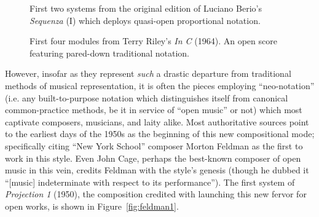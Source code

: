          \begin{figure}
            \centering
            \captionsetup{width=.5\textwidth}
            \caption[First two systems from the original edition of Luciano Berio's \textit{Sequenza} (I, 1958) which deploys quasi-open proportional notation.]{First two systems from the original edition of Luciano Berio's \textit{Sequenza} (I) which deploys quasi-open proportional notation.\footnotemark}
            \label{fig:sequenza}
        \end{figure}

            \begin{figure}
            \centering
            \captionsetup{width=.5\textwidth}
            \caption[First four modules from Terry Riley's \textit{In C} (1964).]{First four modules from Terry Riley's \textit{In C} (1964). An open score featuring pared-down traditional notation.\footnotemark}
            \label{fig:inc}
        \end{figure}

    However, insofar as they represent \textit{such} a drastic departure from traditional methods of musical representation, it is often the pieces employing ``neo-notation'' (i.e. any built-to-purpose notation which distinguishes itself from canonical common-practice methods, be it in service of ``open music'' or not) which most captivate composers, musicians, and laity alike. Most authoritative sources point to the earliest days of the 1950s as the beginning of this new compositional mode; specifically citing ``New York School'' composer Morton Feldman as the first to work in this style. Even John Cage, perhaps the best-known composer of open music in this vein, credits Feldman with the style's genesis (though he dubbed it ``[music] indeterminate with respect to its performance'').\autocite{Dohoney_2017} The first system of \textit{Projection 1} (1950), the composition credited with launching this new fervor for open works, is shown in Figure~\ref{fig:feldman1}.

